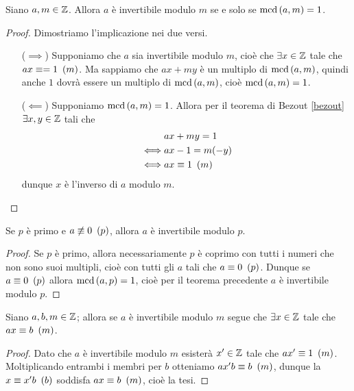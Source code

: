 \begin{theorem}\label{invertibilita_mod_m}
    Siano $a, m \in \mathbb{Z}$. Allora $a$ è invertibile modulo $m$ se e solo se $\operatorname{mcd}\left(a, m\right) = 1$. 
\end{theorem}
\begin{proof}
    Dimostriamo l'implicazione nei due versi.
    \begin{itemize}
        \item[($\implies$)] Supponiamo che $a$ sia invertibile modulo $m$, cioè che $\exists x \in \mathbb{Z}$ tale che $ax \equiv= 1 \ \left(m\right)$. Ma sappiamo che $ax + my$ è un multiplo di $\operatorname{mcd}\left(a, m\right)$, quindi anche $1$ dovrà essere un multiplo di $\operatorname{mcd}\left(a, m\right)$, cioè $\operatorname{mcd}\left(a, m\right) = 1$.
        \item[($\impliedby$)] Supponiamo $\operatorname{mcd}\left(a, m\right) = 1$. Allora per il teorema di Bezout \ref{bezout} $\exists x, y \in \mathbb{Z}$ tali che
        \begin{alignat*}{1}
            &ax + my = 1 \\
            \iff &ax - 1 = m(-y) \\
            \iff &ax \equiv 1 \ \left(m\right)
        \end{alignat*}
        dunque $x$ è l'inverso di $a$ modulo $m$. \qedhere
    \end{itemize}
\end{proof}

\begin{corollary}
    Se $p$ è primo e $a \not\equiv 0 \ \left(p\right)$, allora $a$ è invertibile modulo $p$.
\end{corollary}
\begin{proof}
    Se $p$ è primo, allora necessariamente $p$ è coprimo con tutti i numeri che non sono suoi multipli, cioè con tutti gli $a$ tali che $a \equiv 0 \ \left(p\right)$. Dunque se $a \equiv 0 \ \left(p\right)$ allora $\operatorname{mcd}\left(a, p\right) = 1$, cioè per il teorema precedente $a$ è invertibile modulo $p$.
\end{proof}

\begin{proposition} \label{se_invertibile_allora_soluzione}
    Siano $a, b, m \in \mathbb{Z}$; allora se $a$ è invertibile modulo $m$ segue che $\exists x \in \mathbb{Z}$ tale che $ax \equiv b \ \left(m\right)$.
\end{proposition}
\begin{proof}
    Dato che $a$ è invertibile modulo $m$ esisterà $x^\prime \in \mathbb{Z}$ tale che $ax^\prime \equiv 1 \ \left(m\right)$. Moltiplicando entrambi i membri per $b$ otteniamo $ax'b \equiv b \ \left(m\right)$, dunque la $x \equiv x'b \ \left(b\right)$ soddisfa $ax \equiv b \ \left(m\right)$, cioè la tesi.
\end{proof}

